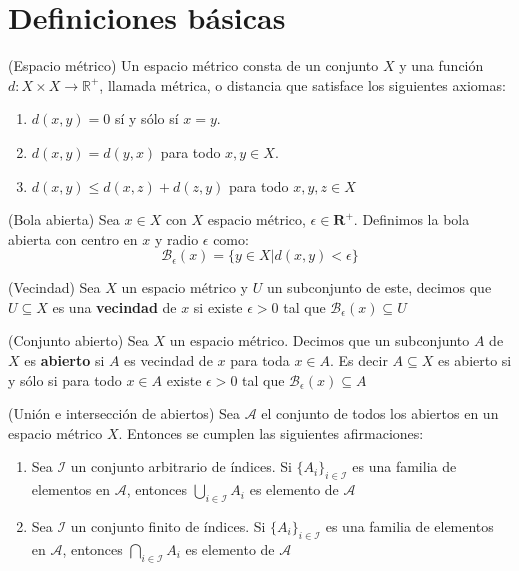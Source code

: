 \chapter{Definiciones básicas}\label{ap:basicas}

\begin{definition}(Espacio métrico)
    Un espacio métrico consta de un conjunto $X$ y una función $d: X \times X \rightarrow \mathbb{R}^{+}$, llamada métrica, o distancia que satisface los siguientes axiomas:
    \begin{enumerate}
        \item $d(x,y) = 0 $ sí y sólo sí $x=y$.
        \item $d(x,y) = d(y,x)$ para todo $x,y \in X$.
        \item $d(x,y) \leq d(x,z) + d(z,y)$ para todo $x,y,z \in X$
    \end{enumerate} 
    
\end{definition}

\begin{definition}(Bola abierta)
    Sea $x \in X$ con $X$ espacio métrico, $\epsilon \in \mathbf{R}^{+}$. Definimos la bola abierta con centro en $x$ y radio $\epsilon$ como:
    \[\mathcal{B}_{\epsilon}(x) = \{y \in X | d(x,y) < \epsilon \}\]
    
\end{definition}

\begin{definition}(Vecindad)
    Sea $X$ un espacio métrico y $U$ un subconjunto de este, decimos que $U \subseteq X$ es una \textbf{vecindad} de $x$ si existe $\epsilon > 0 $ tal que $\mathcal{B}_{\epsilon}(x) \subseteq U$
    
\end{definition}


\begin{definition}(Conjunto abierto)
    Sea $X$ un espacio métrico. Decimos que un subconjunto $A$ de $X$ es \textbf{abierto} si $A$ es vecindad de $x$ para toda $x \in A$. Es decir $A \subseteq X$ es abierto si y sólo si para todo $x \in A$ existe $\epsilon > 0 $ tal que $\mathcal{B}_{\epsilon}(x) \subseteq A$  
\end{definition}

\begin{teorema}(Unión e intersección de abiertos)
    Sea $\mathcal{A}$ el conjunto de todos los abiertos en un espacio métrico $X$. Entonces se cumplen las siguientes afirmaciones:
    \begin{enumerate}
        \item Sea $\mathcal{I}$ un conjunto arbitrario de índices. Si $\{A_i\}_{i \in \mathcal{I}}$ es una familia de elementos en $\mathcal{A}$, entonces $\bigcup_{i \in \mathcal{I}} A_{i}$ es elemento de $\mathcal{A}$
        \item Sea $\mathcal{I}$ un conjunto finito de índices. Si $\{A_i\}_{i \in \mathcal{I}}$ es una familia de elementos en $\mathcal{A}$, entonces $\bigcap_{i \in \mathcal{I}} A_{i}$ es elemento de $\mathcal{A}$
    \end{enumerate}
    
\end{teorema}

